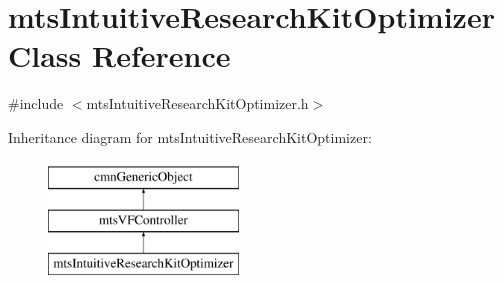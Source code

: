 \hypertarget{classmts_intuitive_research_kit_optimizer}{\section{mts\-Intuitive\-Research\-Kit\-Optimizer Class Reference}
\label{classmts_intuitive_research_kit_optimizer}
}


{\ttfamily \#include $<$mts\-Intuitive\-Research\-Kit\-Optimizer.\-h$>$}

Inheritance diagram for mts\-Intuitive\-Research\-Kit\-Optimizer\-:\begin{figure}[H]
\begin{center}
\leavevmode
\includegraphics[height=3.000000cm]{d9/dc5/classmts_intuitive_research_kit_optimizer}
\end{center}
\end{figure}
